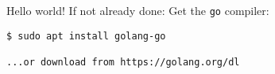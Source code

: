 \documentclass[10pt]{beamer}
\begin{document}
	
	\begin{frame}[fragile]{Hello world!}
		If not already done: Get the \texttt{go} compiler:
		\begin{verbatim}
$ sudo apt install golang-go

...or download from https://golang.org/dl
		\end{verbatim}
\end{frame}
	
	
	\begin{frame}[fragile]{}
	\end{frame}
\end{document}
